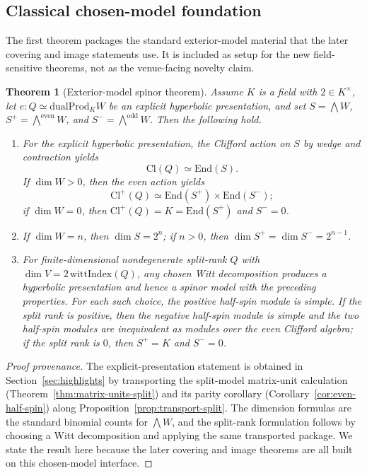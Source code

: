 \documentclass{birkjour}
\theoremstyle{plain}
\newtheorem{theorem}{Theorem}[section]
\theoremstyle{definition}
\theoremstyle{remark}
\newcommand{\Cl}{\mathrm{Cl}}
\newcommand{\End}{\mathrm{End}}
\newcommand{\dualProd}{\mathrm{dualProd}}
\newcommand{\wedgeEven}{\bigwedge^{\mathrm{even}} W}
\newcommand{\wedgeOdd}{\bigwedge^{\mathrm{odd}} W}
\begin{document}
\subsection*{Classical chosen-model foundation}

The first theorem packages the standard exterior-model material that the later
covering and image statements use. It is included as setup for the new
field-sensitive theorems, not as the venue-facing novelty claim.

\begin{theorem}[Exterior-model spinor theorem]
\label{thm:chosen-spinor-package}
Assume $K$ is a field with $2\in K^\times$, let
$e:Q \simeq \dualProd_K W$ be an explicit hyperbolic presentation, and set
$S=\bigwedge W$, $S^+=\wedgeEven$, and $S^-=\wedgeOdd$. Then the following hold.
\begin{enumerate}
\item For the explicit hyperbolic presentation, the Clifford action on $S$ by
  wedge and contraction yields
  \[
    \Cl(Q)\simeq \End(S).
  \]
  If $\dim W>0$, then the even action yields
  \[
    \Cl^+(Q)\simeq \End(S^+) \times \End(S^-);
  \]
  if $\dim W=0$, then $\Cl^+(Q)=K=\End(S^+)$ and $S^-=0$.
\item If $\dim W=n$, then $\dim S = 2^n$; if $n>0$, then
  $\dim S^+ = \dim S^- = 2^{n-1}$.
\item For finite-dimensional nondegenerate split-rank $Q$ with
  $\dim V = 2\,\mathrm{wittIndex}(Q)$, any chosen Witt decomposition produces a
  hyperbolic presentation and hence a spinor model with the preceding
  properties. For each such choice, the positive half-spin module is simple. If
  the split rank is positive, then the negative half-spin module is simple and
  the two half-spin modules are inequivalent as modules over the even Clifford
  algebra; if the split rank is $0$, then $S^+=K$ and $S^-=0$.
\end{enumerate}
\end{theorem}

\begin{proof}[Proof provenance]
The explicit-presentation statement is obtained in
Section~\ref{sec:highlights} by transporting the split-model matrix-unit
calculation (Theorem~\ref{thm:matrix-units-split}) and its parity corollary
(Corollary~\ref{cor:even-half-spin}) along
Proposition~\ref{prop:transport-split}. The dimension formulas are the standard
binomial counts for $\bigwedge W$, and the split-rank formulation follows by
choosing a Witt decomposition and applying the same transported package. We
state the result here because the later covering and image theorems are all
built on this chosen-model interface.
\end{proof}
\end{document}
